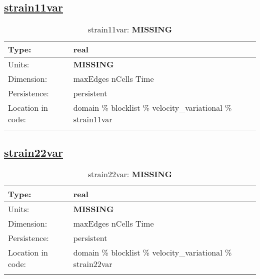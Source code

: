 \subsection[strain11var]{\hyperref[sec:var_tab_velocity_variational]{strain11var}}
\label{subsec:var_sec_velocity_variational_strain11var}
\begin{center}
\begin{longtable}{| p{2.0in} | p{4.0in} |}
        \hline 
        Type: & real \\
        \hline 
        Units: & {\bf \color{red} MISSING} \\
        \hline 
        Dimension: & maxEdges nCells Time \\
        \hline 
        Persistence: & persistent \\
        \hline 
         Location in code: & domain \% blocklist \% velocity\_variational \% strain11var \\
         \hline 
    \caption{strain11var: {\bf \color{red} MISSING}}
\end{longtable}
\end{center}
\subsection[strain22var]{\hyperref[sec:var_tab_velocity_variational]{strain22var}}
\label{subsec:var_sec_velocity_variational_strain22var}
\begin{center}
\begin{longtable}{| p{2.0in} | p{4.0in} |}
        \hline 
        Type: & real \\
        \hline 
        Units: & {\bf \color{red} MISSING} \\
        \hline 
        Dimension: & maxEdges nCells Time \\
        \hline 
        Persistence: & persistent \\
        \hline 
         Location in code: & domain \% blocklist \% velocity\_variational \% strain22var \\
         \hline 
    \caption{strain22var: {\bf \color{red} MISSING}}
\end{longtable}
\end{center}
